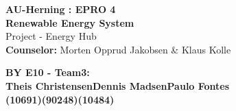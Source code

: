 \begin{centering}
\thispagestyle{empty}
\begin{center}
\textbf{\Huge {AU-Herning : EPRO 4\\[0.1cm]Renewable Energy System}}\\
\huge {Project - Energy Hub}\\ \vspace{0.4cm}
\large{\textbf{Counselor:} Morten Opprud Jakobsen \& Klaus Kolle}\\ \vspace{0.0cm}
\end{center}

\centering
\end{centering}

\begin{center}
\vspace{0.4cm}
\Large{\textbf{BY E10 - Team3: \\ \vspace{0.2cm}Theis Christensen\hspace{1.5cm}Dennis Madsen\hspace{1.5cm}Paulo Fontes}
\\\textbf{(10691)\hspace{3.7cm}(90248)\hspace{3.7cm}(10484)}}
\end{center}

\newpage
\thispagestyle{empty}
\mbox{}